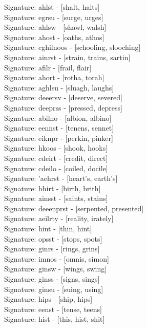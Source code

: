 Signature: {ahlst} - [shalt, halts] \\
Signature: {egrsu} - [surge, urges] \\
Signature: {ahlsw} - [shawl, walsh] \\
Signature: {ahost} - [oaths, athos] \\
Signature: {cghilnoos} - [schooling, slooching] \\
Signature: {ainrst} - [strain, trains, sartin] \\
Signature: {afilr} - [frail, flair] \\
Signature: {ahort} - [rotha, torah] \\
Signature: {aghlsu} - [sluagh, laughs] \\
Signature: {deeersv} - [deserve, severed] \\
Signature: {deeprss} - [pressed, depress] \\
Signature: {abilno} - [albion, albino] \\
Signature: {eennst} - [tenens, sennet] \\
Signature: {eiknpr} - [perkin, pinker] \\
Signature: {hkoos} - [shook, hooks] \\
Signature: {cdeirt} - [credit, direct] \\
Signature: {cdeilo} - [coiled, docile] \\
Signature: {'aehrst} - [heart's, earth's] \\
Signature: {bhirt} - [birth, brith] \\
Signature: {ainsst} - [saints, stains] \\
Signature: {deeenprst} - [serpented, presented] \\
Signature: {aeilrty} - [reality, irately] \\
Signature: {hint} - [thin, hint] \\
Signature: {opsst} - [stops, spots] \\
Signature: {ginrs} - [rings, grins] \\
Signature: {imnos} - [omnis, simon] \\
Signature: {ginsw} - [wings, swing] \\
Signature: {ginss} - [signs, sings] \\
Signature: {ginsu} - [suing, using] \\
Signature: {hips} - [ship, hips] \\
Signature: {eenst} - [tense, teens] \\
Signature: {hist} - [this, hist, shit] \\

